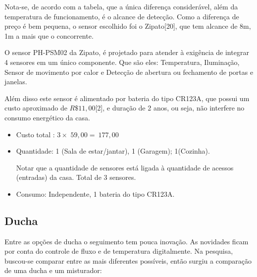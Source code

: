 	Nota-se, de acordo com a tabela, que a única diferença considerável, além da temperatura de funcionamento, é o alcance de detecção. Como a diferença de preço é bem pequena, o sensor escolhido foi o Zipato[20], que tem alcance de 8m, 1m a mais que o concorrente.

	O sensor PH-PSM02 da Zipato, é projetado para atender à exigência de integrar 4 sensores em um único componente.  Que são eles: Temperatura, Iluminação, Sensor de movimento por calor e Detecção de abertura ou fechamento de portas e janelas.

	Além disso este sensor é alimentado por bateria do tipo CR123A, que possui um custo aproximado de $R\$ 11,00$[2], e duração de 2 anos, ou seja, não interfere no consumo energético da casa.

\begin{itemize}
\item Custo total : $3\times$ \texteuro$59,00 =\ $\texteuro$177,00$

\item Quantidade: 1 (Sala de estar/jantar), 1 (Garagem);  1(Cozinha).

Notar que a quantidade de sensores está ligada à quantidade de acessos (entradas) da casa. Total de 3 sensores.

\item Consumo: Independente, 1 bateria do tipo CR123A.
\end{itemize}

\subsection{Ducha}

	Entre as opções de ducha o seguimento tem pouca inovação. As novidades ficam por conta do controle de fluxo e de temperatura digitalmente. Na pesquisa, buscou-se comparar entre as mais diferentes possíveis, então surgiu a comparação de uma ducha e um misturador:

